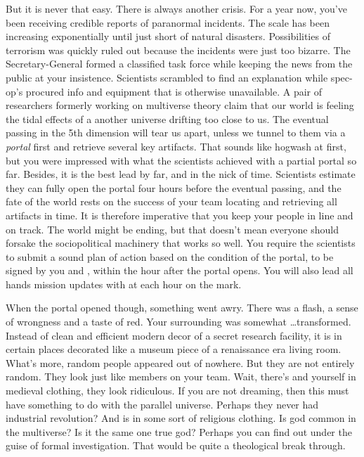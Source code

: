 \documentclass[char]{guildcamp3}
\begin{document}
But it is never that easy. There is always another crisis. For a year now, you've been receiving credible reports of paranormal incidents. The scale has been increasing exponentially until just short of natural disasters. Possibilities of terrorism was quickly ruled out because the incidents were just too bizarre. The Secretary-General formed a classified task force while keeping the news from the public at your insistence. Scientists scrambled to find an explanation while spec-op's procured info and equipment that is otherwise unavailable. A pair of researchers formerly working on multiverse theory claim that our world is feeling the tidal effects of a another universe drifting too close to us. The eventual passing in the 5th dimension will tear us apart, unless we tunnel to them via a \emph{portal} first and retrieve several key artifacts. That sounds like hogwash at first, but you were impressed with what the scientists achieved with a partial portal so far. Besides, it is the best lead by far, and in the nick of time. Scientists estimate they can fully open the portal four hours before the eventual passing, and the fate of the world rests on the success of your team locating and retrieving all artifacts in time. It is therefore imperative that you keep your people in line and on track. The world might be ending, but that doesn't mean everyone should forsake the sociopolitical machinery that works so well. You require the scientists to submit a sound plan of action based on the condition of the portal, to be signed by you and \cPoliTwo{}, within the hour after the portal opens. You will also lead all hands mission updates with \cPoliTwo{} at each hour on the mark. 

When the portal opened though, something went awry. There was a flash, a sense of wrongness and a taste of red. Your surrounding was somewhat \ldots transformed. Instead of clean and efficient modern decor of a secret research facility, it is in certain places decorated like a museum piece of a renaissance era living room. What's more, random people appeared out of nowhere. But they are not entirely random. They look just like members on your team. Wait, there's \cPoliTwo{} and yourself in medieval clothing, they look ridiculous. If you are not dreaming, then this must have something to do with the parallel universe. Perhaps they never had industrial revolution? And \cTech{} is in some sort of religious clothing. Is god common in the multiverse? Is it the same one true god? Perhaps you can find out under the guise of formal investigation. That would be quite a theological break through.
\end{document}
